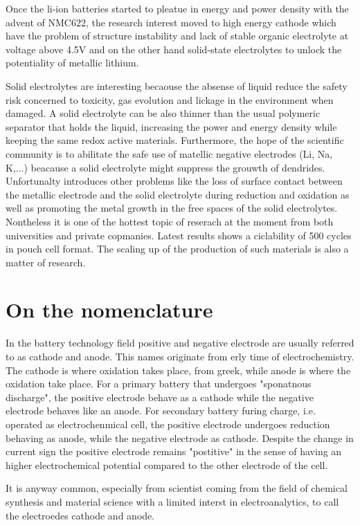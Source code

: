 Once the li-ion batteries started to pleatue in energy and power density with the advent of NMC622, the research interest moved to high energy cathode which have the problem of structure instability and lack of stable organic electrolyte at voltage above 4.5V and on the other hand solid-state electrolytes to unlock the potentiality of metallic lithium.

Solid electrolytes are interesting becaouse the absense of liquid reduce the safety risk concerned to toxicity, gas evolution and lickage in the environment when damaged. A solid electrolyte can be also thinner than the usual polymeric separator that holds the liquid, increasing the power and energy density while keeping the same redox active materials. Furthermore, the hope of the scientific community is to abilitate the safe use of matellic negative electrodes (Li, Na, K,...) beacause a solid electrolyte  might suppress the grouwth of dendrides. Unfortunalty introduces other problems like the loss of surface contact between the metallic electrode and the solid electrolyte during reduction and oxidation as well as promoting the metal growth in the free spaces of the solid electrolytes. Nontheless it is one of the hottest topic of reserach at the moment from both universities and private copmanies. Latest results shows a ciclability of 500 cycles in pouch cell format. The scaling up of the production of such materials is also a matter of research.


\section{On the nomenclature}

In the battery technology field positive and negative electrode are usually referred to as cathode and anode. This names originate from erly time of electrochemistry. The cathode is where oxidation takes place, from greek, while anode is where the oxidation take place. For a primary battery that undergoes "sponatnous discharge", the positive electrode behave as a cathode while the negative electrode behaves like an anode. For secondary battery furing charge, i.e. operated as electrochenmical cell, the positive electrode undergoes reduction behaving as anode, while the negative electrode as cathode. Despite the change in current sign the positive electrode remains "postitive" in the sense of having an higher electrochemical potential compared to the other electrode of the cell.

It is anyway common, especially from scientist coming from the field of chemical synthesis and material science with a limited interst in electroanalytics, to call the electroedes cathode and anode. 

